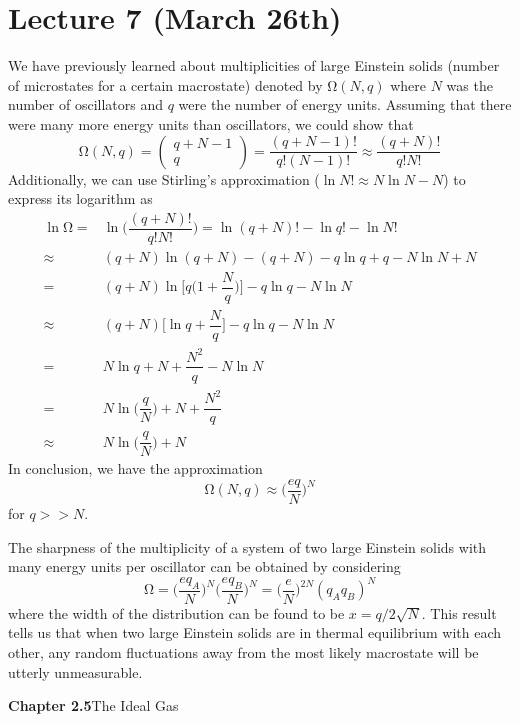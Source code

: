 \section{Lecture 7 (March 26th)}
\begin{recall}
We have previously learned about multiplicities of large Einstein solids (number of microstates for a certain macrostate) denoted by $\mathrm{\Omega} (N,q)$ where $N$ was the number of oscillators and $q$ were the number of energy units. Assuming that there were many more energy units than oscillators, we could show that 
\[\mathrm{\Omega} (N,q)=\begin{pmatrix}
q+N-1\\q
\end{pmatrix}=\dfrac{(q+N-1)!}{q!(N-1)!}\approx \dfrac{(q+N)!}{q!N!}\]
Additionally, we can use Stirling's approximation ($\ln N!\approx N\ln N- N$) to express its logarithm as
\begin{align*}
\ln \mathrm{\Omega} =& \ln \Big(\dfrac{(q+N)!}{q!N!}\Big)=\ln (q+N)!-\ln q!-\ln N!\\
\approx & (q+N)\ln (q+N)-(q+N)-q\ln q+q-N\ln N +N\\
=& (q+N)\ln \Big[q\Big(1+\dfrac{N}{q}\Big)\Big]-q\ln q-N\ln N\\
\approx &(q+N)\Big[\ln q+\dfrac{N}{q}\Big]-q\ln q-N\ln N\\
=& N\ln q+N+\dfrac{N^2}{q}-N\ln N\\
=& N\ln \Big(\dfrac{q}{N}\Big)+N+\dfrac{N^2}{q}\\ 
\approx &N\ln \Big(\dfrac{q}{N}\Big)+N
\end{align*}
In conclusion, we have the approximation
\[\mathrm{\Omega} (N,q)\approx \Big(\dfrac{eq}{N}\Big)^{N}\]
for $q>>N$.
\end{recall}
\vspace{2ex}
\begin{thm}
The sharpness of the multiplicity of a system of two large Einstein solids with many energy units per oscillator can be obtained by considering 
\[\mathrm{\Omega} =\Big(\dfrac{eq_{A}}{N}\Big)^{N}\Big(\dfrac{eq_{B}}{N}\Big)^{N}=\Big(\dfrac{e}{N}\Big)^{2N}(q_{A}q_{B})^{N}\]
where the width of the distribution can be found to be $x=q/2\sqrt{N}$. This result tells us that when two large Einstein solids are in thermal equilibrium with each other, any random fluctuations away from the most likely macrostate will be utterly unmeasurable.
\end{thm}
\vspace{2ex}
{\bf Chapter 2.5}\hspace{5ex}The Ideal Gas
